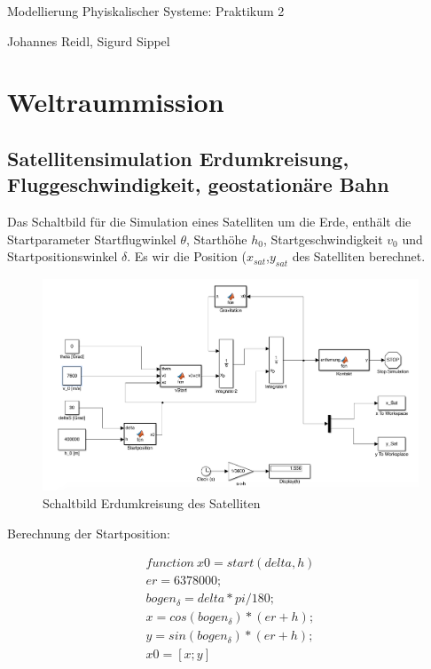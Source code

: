 \documentclass[10pt,a4paper]{article}
\begin{document}
\begin{center}
Modellierung Phyiskalischer Systeme: Praktikum 2

Johannes Reidl, Sigurd Sippel

\end{center}

\section{Weltraummission}

\subsection{Satellitensimulation Erdumkreisung, Fluggeschwindigkeit, geostationäre Bahn}

Das Schaltbild für die Simulation eines Satelliten um die Erde, enthält die Startparameter Startflugwinkel $\theta$, Starthöhe $h_0$, Startgeschwindigkeit $v_0$ und Startpositionswinkel $\delta$.  Es wir die Position ($x_{sat}$,$y_{sat}$  des Satelliten berechnet.

	\begin{figure}[H]
		\centering
		\includegraphics[width=1\textwidth]{../aufgabe1/screens/simulink.png}
		\caption{Schaltbild Erdumkreisung des Satelliten}
	\end{figure}

Berechnung der Startposition:

\begin{align}
function \: x0 = start(delta, h) 
\\er = 6378000; \nonumber %
\\bogen_\delta = delta * pi / 180;\nonumber
\\x  = cos(bogen_{\delta}) * (er + h); \nonumber
\\y  = sin(bogen_{\delta}) * (er + h);\nonumber
\\ x0 = [x ; y]\nonumber
\end{align}
\end{document}
